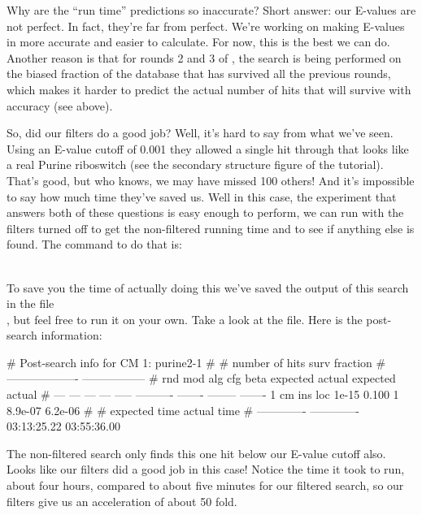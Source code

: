 \begin{srefaq}{Why are the  ``run time'' predictions 
  so inaccurate?} Short answer: our E-values are not perfect. In fact,
  they're far from perfect. We're working on making E-values in
   more accurate and easier to calculate. For now,
  this is the best we can do. Another reason is that for rounds 2 and
  3 of , the search is being performed on the biased
  fraction of the database that has survived all the previous rounds,
  which makes it harder to predict the actual number of hits that will
  survive with accuracy (see above).
\end{srefaq}

So, did our filters do a good job? Well, it's hard to say from what
we've seen. Using an E-value cutoff of 0.001 they allowed a single hit
through that looks like a real Purine riboswitch (see the secondary
structure figure of the tutorial). That's good, but who knows, we may
have missed 100 others!  And it's impossible to say how much time
they've saved us. Well in this case, the experiment that answers both
of these questions is easy enough to perform, we can run
 with the filters turned off 
to get the non-filtered running time and to see if anything else
is found. The command to do that is: 

\\

To save you the time of actually doing this we've saved the
output of this search in the file\\
 ,
but feel free to run it on your own. Take a look at the file. Here is
the post-search information:


{\samepage
\begin{sreoutput}
# Post-search info for CM 1: purine2-1
#
#                              number of hits       surv fraction  
#                            -------------------  -----------------
# rnd  mod  alg  cfg   beta    expected   actual  expected   actual
# ---  ---  ---  ---  -----  ----------  -------  --------  -------
    1   cm  ins  loc  1e-15       0.100        1   8.9e-07  6.2e-06
#
# expected time    actual time
# -------------  -------------
    03:13:25.22    03:55:36.00
\end{sreoutput}
}

The non-filtered search only finds this one hit below our E-value
cutoff also. Looks like our filters did a good job in this case!
Notice the time it took to run, about four hours, compared to about five
minutes for our filtered search, so our filters give us an
acceleration of about 50 fold. 

